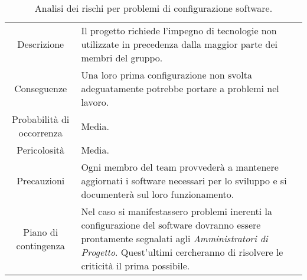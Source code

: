 \begin{table} [H]
    \begin{tabular}{|c|p{11.5cm}|}
    \rowcolor{darkblue} \hline
    \multicolumn{2}{|c|}{\textcolor{white}{\textbf{RT4 - Problemi nella configurazione software}}}\\ \hline
    Descrizione & Il progetto richiede l'impegno di tecnologie non utilizzate in precedenza dalla maggior parte dei membri del gruppo.\\ \hline
    Conseguenze & Una loro prima configurazione non svolta adeguatamente potrebbe portare a problemi nel lavoro.\\ \hline
    Probabilità di occorrenza & Media.\\ \hline
    Pericolosità & Media.\\ \hline
    Precauzioni & Ogni membro del team provvederà a mantenere aggiornati i software necessari per lo sviluppo e si documenterà sul loro funzionamento.\\ \hline
    Piano di contingenza & Nel caso si manifestassero problemi inerenti la configurazione del software dovranno essere prontamente segnalati agli \textit{Amministratori di Progetto}. Quest'ultimi cercheranno di risolvere le criticità il prima possibile.\\ \hline
    \end{tabular}
    \caption{\label{tab:RT4}Analisi dei rischi per problemi di configurazione software.}
\end{table}